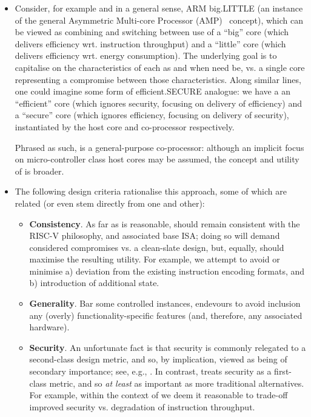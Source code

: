 \begin{itemize}
\item Consider, for example and in a general sense, ARM {\sf big.LITTLE}
      (an instance of the general Asymmetric Multi-core Processor (AMP)~\cite{SCARV:Mittal:16} concept),
      which can be viewed as combining and switching between
      use of
      a ``big''    core (which delivers efficiency wrt. instruction throughput)
      and 
      a ``little'' core (which delivers efficiency wrt. energy consumption).
      The underlying goal is to capitalise on the characteristics of each as 
      and when need be, vs. a single core representing a compromise between 
      those characteristics.  Along similar lines, one could imagine some
      form of {\sf efficient.SECURE} analogue: we have a 
      an ``efficient'' core (which ignores   security, focusing on delivery of efficiency)
      and
      a  ``secure''    core (which ignores efficiency, focusing on delivery of   security),
      instantiated by the host core and \XCID co-processor respectively.

      Phrased as such, \XCID is a general-purpose co-processor: although an
      implicit focus on micro-controller class host cores may be assumed, 
      the concept and utility of \XCID is broader.

\item The following design criteria rationalise this approach, some of which
      are related (or even stem directly from one and other):

      \begin{itemize}
      \item {\bf      Consistency}.
            As far as is reasonable, \XCID should remain consistent with the
            RISC-V philosophy, and associated base ISA; doing so will demand 
            considered compromises vs. a clean-slate design, but, equally,
            should maximise the resulting utility.
            For example,
            we attempt to avoid or minimise 
            a) deviation from the existing instruction encoding formats,
               and 
            b) introduction of additional state.
      \item {\bf       Generality}.
            Bar some controlled instances, \XCID endevours to avoid inclusion
            any (overly) functionality-specific features (and, therefore, any
            associated hardware).  
      \item {\bf         Security}.
            An unfortunate fact is that security is commonly relegated to a 
            second-class design metric, and so, by implication, viewed as 
            being of secondary importance;
            see, e.g., \cite{SCARV:RKLMR:03,SCARV:RRKH:04,SCARV:BurMutTiw:16}.
            In contrast, \XCID treats security as a first-class metric, and
            so {\em at least} as important as more traditional alternatives.
            For example,
            within the context of \XCID we deem it reasonable to trade-off 
            improved security vs. degradation of instruction throughput.


\end{itemize}
\end{itemize}
